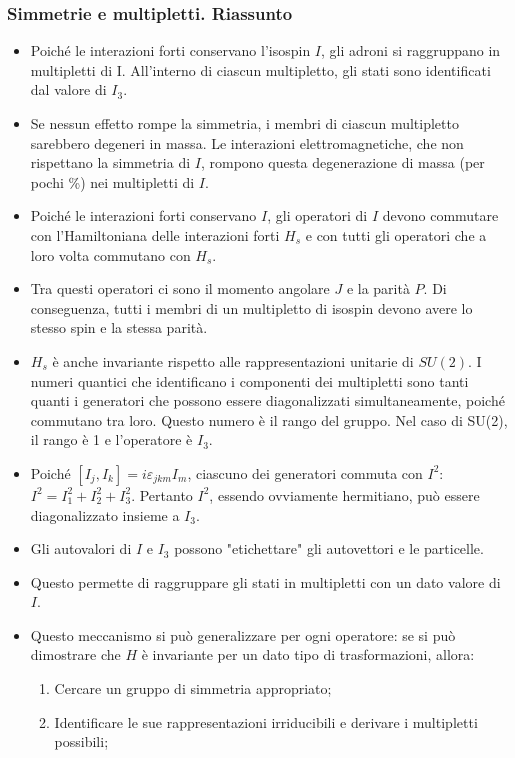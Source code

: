 \subsubsection{Simmetrie e multipletti. Riassunto}
\begin{itemize}
\item Poiché le interazioni forti conservano l'isospin $I$, gli adroni si raggruppano in multipletti di I. All'interno di ciascun multipletto, gli stati sono identificati dal valore di \( I_3 \).  
\item Se nessun effetto rompe la simmetria, i membri di ciascun multipletto sarebbero degeneri in massa. Le interazioni elettromagnetiche, che non rispettano la simmetria di \( I \), rompono questa degenerazione di massa (per pochi \%) nei multipletti di \( I \).  
\item Poiché le interazioni forti conservano \( I \), gli operatori di \( I \) devono commutare con l'Hamiltoniana delle interazioni forti $H_s$ e con tutti gli operatori che a loro volta commutano con $H_s$.  
\item Tra questi operatori ci sono il momento angolare \( J \) e la parità \( P \). Di conseguenza, tutti i membri di un multipletto di isospin devono avere lo stesso spin e la stessa parità.  
\item $H_s$ è anche invariante rispetto alle rappresentazioni unitarie di $SU(2)$. I numeri quantici che identificano i componenti dei multipletti sono tanti quanti i generatori che possono essere diagonalizzati simultaneamente, poiché commutano tra loro. Questo numero è il rango del gruppo. Nel caso di SU(2), il rango è 1 e l'operatore è \( I_3 \).  
\item Poiché \([I_j, I_k] = i\varepsilon_{jkm}I_m\), ciascuno dei generatori commuta con \( I^2 \):  
\( I^2 = I_1^2 + I_2^2 + I_3^2 \).  
Pertanto \( I^2 \), essendo ovviamente hermitiano, può essere diagonalizzato insieme a \( I_3 \).  
\item Gli autovalori di \( I \) e \( I_3 \) possono "etichettare" gli autovettori e le particelle.  
\item Questo permette di raggruppare gli stati in multipletti con un dato valore di \( I \).  
\item Questo meccanismo si può generalizzare per ogni operatore: se si può dimostrare che \( H \) è invariante per un dato tipo di trasformazioni, allora:
\begin{enumerate}
    \item Cercare un gruppo di simmetria appropriato;
    \item Identificare le sue rappresentazioni irriducibili e derivare i multipletti possibili;  

\end{enumerate}
\end{itemize}
